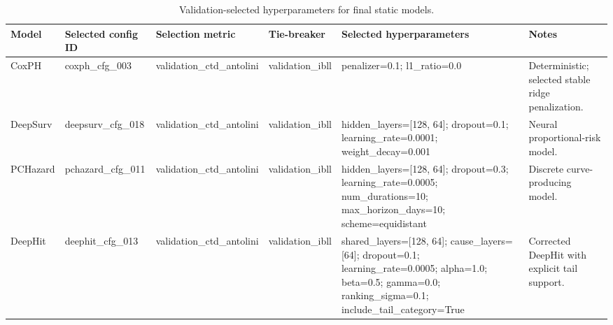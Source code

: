 \begin{table}
\caption{Validation-selected hyperparameters for final static models.}
\label{tab:static_selected_hyperparameters}
\begin{tabular}{llllll}
\toprule
Model & Selected config ID & Selection metric & Tie-breaker & Selected hyperparameters & Notes \\
\midrule
CoxPH & coxph_cfg_003 & validation_ctd_antolini & validation_ibll & penalizer=0.1; l1_ratio=0.0 & Deterministic; selected stable ridge penalization. \\
DeepSurv & deepsurv_cfg_018 & validation_ctd_antolini & validation_ibll & hidden_layers=[128, 64]; dropout=0.1; learning_rate=0.0001; weight_decay=0.001 & Neural proportional-risk model. \\
PCHazard & pchazard_cfg_011 & validation_ctd_antolini & validation_ibll & hidden_layers=[128, 64]; dropout=0.3; learning_rate=0.0005; num_durations=10; max_horizon_days=10; scheme=equidistant & Discrete curve-producing model. \\
DeepHit & deephit_cfg_013 & validation_ctd_antolini & validation_ibll & shared_layers=[128, 64]; cause_layers=[64]; dropout=0.1; learning_rate=0.0005; alpha=1.0; beta=0.5; gamma=0.0; ranking_sigma=0.1; include_tail_category=True & Corrected DeepHit with explicit tail support. \\
\bottomrule
\end{tabular}
\end{table}
